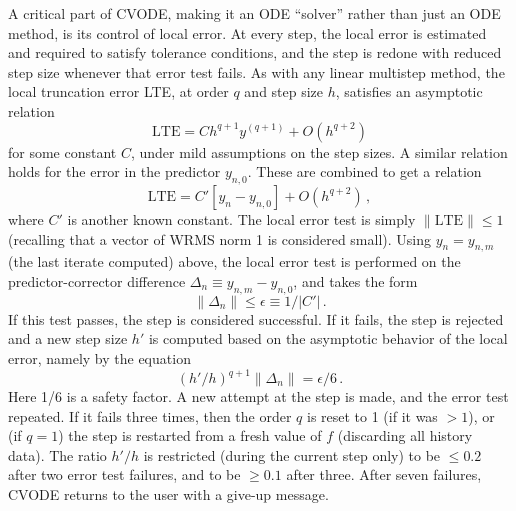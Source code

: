 A critical part of CVODE, making it an ODE ``solver'' rather than
just an ODE method, is its control of local error.  At every step, the
local error is estimated and required to satisfy tolerance conditions,
and the step is redone with reduced step size whenever that error test
fails.  As with any linear multistep method, the local truncation
error LTE, at order $q$ and step size $h$, satisfies an asymptotic
relation
\[ \mbox{LTE} = C h^{q+1} y^{(q+1)} + O(h^{q+2}) \]
for some constant $C$, under mild assumptions on the step sizes.
A similar relation holds for the error in the predictor $y_{n,0}$.
These are combined to get a relation
\[ \mbox{LTE} = C' [y_n - y_{n,0}] + O(h^{q+2}) \, , \]
where $C'$ is another known constant.  The local error test is simply
$\|\mbox{LTE}\| \leq 1$ (recalling that a vector of WRMS norm 1 is
considered small).  Using $y_n = y_{n,m}$ (the last iterate computed)
above, the local error test is performed on the predictor-corrector
difference $\Delta_n \equiv y_{n,m} - y_{n,0}$, and takes the form
\[ \|\Delta_n\| \leq \epsilon \equiv 1/|C'| \, . \]
If this test passes, the step is considered successful.  If it fails,
the step is rejected and a new step size $h'$ is computed based on the
asymptotic behavior of the local error, namely by the equation
\[ (h'/h)^{q+1} \|\Delta_n\| = \epsilon/6 \, . \]
Here 1/6 is a safety factor.  A new attempt at the step is made,
and the error test repeated.  If it fails three times, then the order
$q$ is reset to 1 (if it was $> 1$), or (if $q = 1$) the step is
restarted from a fresh value of $f$ (discarding all history data).
The ratio $h'/h$ is restricted (during the current step only) to be
$\leq 0.2$ after two error test failures, and to be $\geq 0.1$ after
three.  After seven failures, CVODE returns to the user with a give-up
message.

